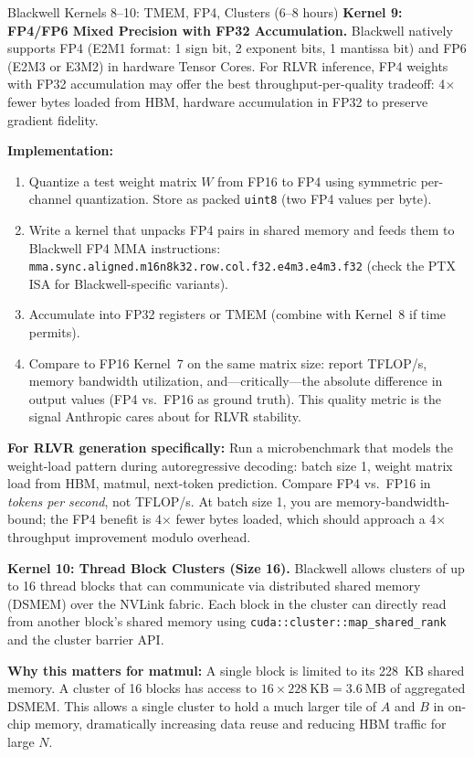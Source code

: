 \begin{exercise}{Blackwell Kernels 8--10: TMEM, FP4, Clusters (6--8 hours)}
\medskip
\textbf{Kernel 9: FP4/FP6 Mixed Precision with FP32 Accumulation.}
Blackwell natively supports FP4 (E2M1 format: 1 sign bit, 2 exponent bits, 1 mantissa bit) and FP6 (E2M3 or E3M2) in hardware Tensor Cores. For RLVR inference, FP4 weights with FP32 accumulation may offer the best throughput-per-quality tradeoff: 4$\times$ fewer bytes loaded from HBM, hardware accumulation in FP32 to preserve gradient fidelity.

\textbf{Implementation:}
\begin{enumerate}
  \item Quantize a test weight matrix $W$ from FP16 to FP4 using symmetric per-channel quantization. Store as packed \texttt{uint8} (two FP4 values per byte).
  \item Write a kernel that unpacks FP4 pairs in shared memory and feeds them to Blackwell FP4 MMA instructions: \texttt{mma.sync.aligned.m16n8k32.row.col.f32.e4m3.e4m3.f32} (check the PTX ISA for Blackwell-specific variants).
  \item Accumulate into FP32 registers or TMEM (combine with Kernel~8 if time permits).
  \item Compare to FP16 Kernel~7 on the same matrix size: report TFLOP/s, memory bandwidth utilization, and---critically---the absolute difference in output values (FP4 vs.\ FP16 as ground truth). This quality metric is the signal Anthropic cares about for RLVR stability.
\end{enumerate}

\textbf{For RLVR generation specifically:} Run a microbenchmark that models the weight-load pattern during autoregressive decoding: batch size 1, weight matrix load from HBM, matmul, next-token prediction. Compare FP4 vs.\ FP16 in \textit{tokens per second}, not TFLOP/s. At batch size 1, you are memory-bandwidth-bound; the FP4 benefit is 4$\times$ fewer bytes loaded, which should approach a 4$\times$ throughput improvement modulo overhead.

\medskip
\textbf{Kernel 10: Thread Block Clusters (Size 16).}
Blackwell allows clusters of up to 16 thread blocks that can communicate via distributed shared memory (DSMEM) over the NVLink fabric. Each block in the cluster can directly read from another block's shared memory using \texttt{cuda::cluster::map\_shared\_rank} and the cluster barrier API.

\textbf{Why this matters for matmul:} A single block is limited to its 228~KB shared memory. A cluster of 16 blocks has access to $16 \times 228~\text{KB} = 3.6~\text{MB}$ of aggregated DSMEM. This allows a single cluster to hold a much larger tile of $A$ and $B$ in on-chip memory, dramatically increasing data reuse and reducing HBM traffic for large $N$.


\end{exercise}
